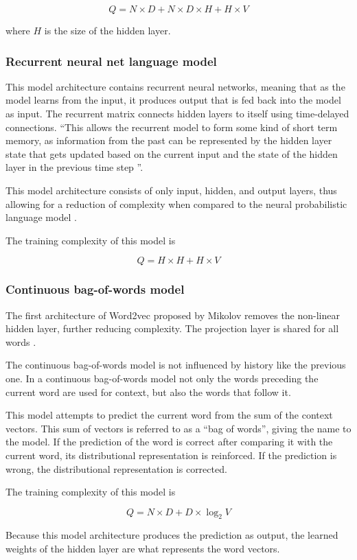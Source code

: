 \documentclass[14pt, a4paper]{extreport}
\begin{document}
\[Q = N \times D + N \times D \times H + H \times V\]

where \(H\) is the size of the hidden layer.
      \subsubsection{Recurrent neural net language model}
This model architecture contains recurrent neural networks, meaning that as the model learns from the input, it produces output that is fed back into the model as input. The recurrent matrix connects hidden layers to itself using time-delayed connections. ``This allows the recurrent model to form some kind of short term memory, as information from the past can be represented by the hidden layer state that gets updated based on the current input and the state of the hidden layer in the previous time step \parencite{mikolov}''.

This model architecture consists of only input, hidden, and output layers, thus allowing for a reduction of complexity when compared to the neural probabilistic language model \parencite{mikolov}.

The training complexity of this model is

\[Q = H \times H + H \times V\]
      \subsubsection{Continuous bag-of-words model}
The first architecture of Word2vec proposed by Mikolov removes the non-linear hidden layer, further reducing complexity. The projection layer is shared for all words \parencite{mikolov}.

The continuous bag-of-words model is not influenced by history like the previous one. In a continuous bag-of-words model not only the words preceding the current word are used for context, but also the words that follow it.

This model attempts to predict the current word from the sum of the context vectors. This sum of vectors is referred to as a ``bag of words'', giving the name to the model. If the prediction of the word is correct after comparing it with the current word, its distributional representation is reinforced. If the prediction is wrong, the distributional representation is corrected.

The training complexity of this model is

\[Q = N \times D + D \times \log_2{V}\]

Because this model architecture produces the prediction as output, the learned weights of the hidden layer are what represents the word vectors.
\end{document}

